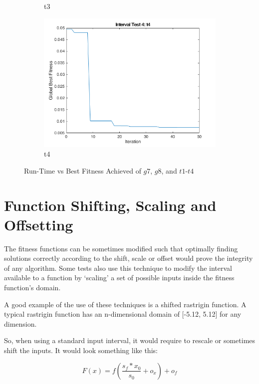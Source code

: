 \begin{figure}
\begin{subfigure}[b]{0.4\textwidth}
    \caption{t3}
  \end{subfigure}
  \begin{subfigure}[b]{0.4\textwidth}
    \includegraphics[width=\textwidth]{img/summary/t4}
    \caption{t4}
  \end{subfigure}
  \caption{Run-Time vs Best Fitness Achieved of $g7$, $g8$, and $t1$-$t4$ }
\end{figure}

\clearpage

\section{Function Shifting, Scaling and Offsetting}

\par The fitness functions can be sometimes modified such that optimally finding solutions correctly according to the shift, scale or offset would prove the integrity of any algorithm. Some tests also use this technique to modify the interval available to a function by `scaling' a set of possible inputs inside the fitness function's domain.

\par A good example of the use of these techniques is a shifted rastrigin function. A typical rastrigin function has an n-dimensional domain of [-5.12, 5.12] for any dimension.

\par So, when using a standard input interval, it would require to rescale or sometimes shift the inputs. It would look something like this:

$$
  F(x) = f\left(\frac{s_f * x_0}{s_0} + o_x\right) + o_f
$$

